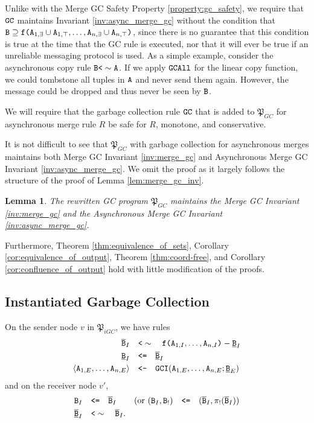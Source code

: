 \documentclass{article}
\numberwithin{equation}{section}
\newtheorem{lemma}[theorem]{Lemma}
\renewcommand{\tt}[1]{\ifmmode\text{\texttt{#1}}\else\texttt{#1}\fi}
\begin{document}
Unlike with the Merge GC Safety Property \ref{property:gc_safety}, we require that $\tt{GC}$ maintains Invariant \ref{inv:async_merge_gc} without the condition that 
$\tt{B} \supseteq \tt{f}\tt{(}\tt{A}_{1,\exists} \cup \tt{A}_{1,\top},\dots,\tt{A}_{n,\exists} \cup \tt{A}_{n,\top}\tt{)}$,
since there is no guarantee that this condition is true at the time that the GC rule is executed, nor that it will ever be true if an unreliable messaging protocol is used.
As a simple example, consider the asynchronous copy rule $\tt{B} \tt{<}\sim \tt{A}$.
If we apply $\tt{GCAll}$ for the linear copy function, we could tombstone all tuples in $\tt{A}$ and never send them again.
However, the message could be dropped and thus never be seen by $\tt{B}$.


We will require that the garbage collection rule $\tt{GC}$ that is added to $\mathfrak{P}_{GC}$ for asynchronous merge rule $R$ be safe for $R$, monotone, and conservative.

It is not difficult to see that $\mathfrak{P}_{GC}$ with garbage collection for asynchronous merges maintains both Merge GC Invariant \ref{inv:merge_gc} and Asynchronous Merge GC Invariant \ref{inv:async_merge_gc}.
We omit the proof as it largely follows the structure of the proof of Lemma \ref{lem:merge_gc_inv}.

\begin{lemma}
\label{lem:async_merge_gc_inv}
The rewritten GC program $\mathfrak{P}_{GC}$ maintains the Merge GC Invariant \ref{inv:merge_gc} and the Asynchronous Merge GC Invariant \ref{inv:async_merge_gc}.
\end{lemma}

Furthermore, Theorem \ref{thm:equivalence_of_sets}, Corollary \ref{cor:equivalence_of_output}, Theorem \ref{thm:coord-free}, and Corollary \ref{cor:confluence_of_output} hold with little modification of the proofs.


\subsection{Instantiated Garbage Collection}
On the sender node $v$ in $\mathfrak{P}_{iGC}$, we have rules
\begin{align*}
\overline{\tt{B}}_I &\quad\tt{<}\sim\quad \tt{f}\tt{(}\tt{A}_{1,I}, \dots, \tt{A}_{n,I}\tt{)} - \underline{\tt{B}}_I\\
\underline{\tt{B}}_I &\quad\tt{<=}\quad \overline{\underline{\tt{B}}}_I\\
\langle \tt{A}_{1,E}, \dots, \tt{A}_{n,E} \rangle
&\quad\tt{<-}\quad
\tt{GCI}(\tt{A}_{1,E}, \dots, \tt{A}_{n,E}; \underline{\tt{B}}_{E})
\end{align*}
and on the receiver node $v'$,
\begin{align*}
\tt{B}_I &\quad\tt{<=}\quad \overline{\tt{B}}_I & \text{(or $(\tt{B}_I, \tt{B}_!) \quad\tt{<=}\quad (\overline{\tt{B}}_I, \pi_!(\overline{\tt{B}}_I$))}\\
\overline{\underline{\tt{B}}}_I &\quad\tt{<}\sim\quad \overline{\tt{B}}_I.
\end{align*}
\end{document}
